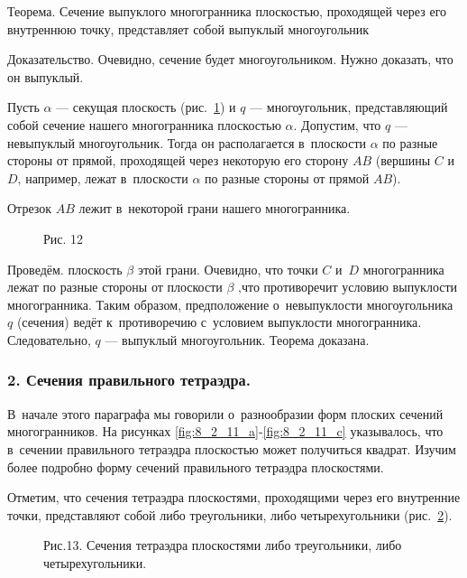 \begin{Th}\label{th:8_2_1}
Теорема. Сечение выпуклого многогранника плоскостью, проходящей через его
внутреннюю точку, представляет собой выпуклый многоугольник
\end{Th}

Доказательство. Очевидно, сечение будет многоугольником. Нужно доказать,
что он выпуклый.

Пусть $\alpha$ --- секущая плоскость (рис.\ \ref{fig:8_2_12}) и $q$ --- многоугольник,
представляющий собой сечение нашего многогранника плоскостью $\alpha$.
Допустим, что $q$ --- невыпуклый многоугольник. Тогда он располагается в~плоскости
$\alpha$ по разные стороны от прямой, проходящей через некоторую его сторону $AB$
(вершины $C$ и~$D$‚ например, лежат в~плоскости $\alpha$ по разные стороны от
прямой $AB$).

Отрезок $AB$ лежит в~некоторой грани нашего многогранника.

\begin{figure}\label{fig:8_2_12}
\caption{Рис. 12}
\end{figure}

Проведём. плоскость $\beta$ этой грани. Очевидно, что точки $C$ и~$D$ многогранника
лежат по разные стороны от плоскости $\beta$ ‚что противоречит условию выпуклости
многогранника. Таким образом, предположение о~невыпуклости многоугольника $q$
(сечения) ведёт к~противоречию с~условием выпуклости многогранника.
Следовательно, $q$ --- выпуклый многоугольник. Теорема доказана.


\subsubsection{2. Сечения правильного тетраэдра.}

В~начале этого параграфа мы говорили о~разнообразии форм плоских сечений
многогранников. На рисунках \ref{fig:8_2_11_a}-\ref{fig:8_2_11_c} указывалось,
что в~сечении правильного тетраэдра плоскостью может получиться квадрат.
Изучим более подробно форму сечений правильного тетраэдра плоскостями.

Отметим, что сечения тетраэдра плоскостями, проходящими через его внутренние
точки, представляют собой либо треугольники, либо четырехугольники (рис.\
\ref{fig:8_2_13}).

\begin{figure}\label{fig:8_2_13}
\caption{Рис.13. Сечения тетраэдра плоскостями либо треугольники,
либо четырехугольники.}
\end{figure}

